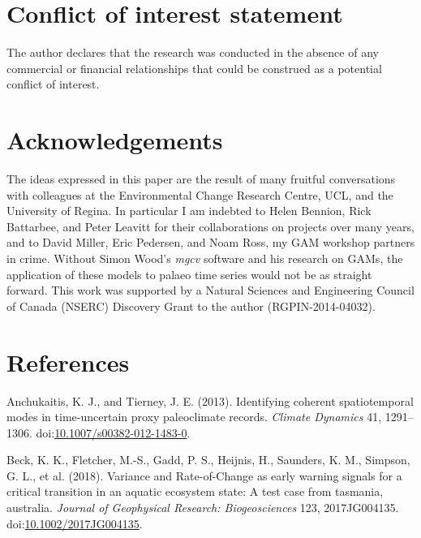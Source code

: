 \documentclass[12pt,]{article}
\begin{document}
\section*{Conflict of interest
statement}\label{conflict-of-interest-statement}

The author declares that the research was conducted in the absence of
any commercial or financial relationships that could be construed as a
potential conflict of interest.

\section*{Acknowledgements}\label{acknowledgements}

The ideas expressed in this paper are the result of many fruitful
conversations with colleagues at the Environmental Change Research
Centre, UCL, and the University of Regina. In particular I am indebted
to Helen Bennion, Rick Battarbee, and Peter Leavitt for their
collaborations on projects over many years, and to David Miller, Eric
Pedersen, and Noam Ross, my GAM workshop partners in crime. Without
Simon Wood's \emph{mgcv} software and his research on GAMs, the
application of these models to palaeo time series would not be as
straight forward. This work was supported by a Natural Sciences and
Engineering Council of Canada (NSERC) Discovery Grant to the author
(RGPIN-2014-04032).

\section*{References}\label{references}

\hypertarget{refs}{}
\hypertarget{ref-Anchukaitis2013-la}{}
Anchukaitis, K. J., and Tierney, J. E. (2013). Identifying coherent
spatiotemporal modes in time-uncertain proxy paleoclimate records.
\emph{Climate Dynamics} 41, 1291--1306.
doi:\href{https://doi.org/10.1007/s00382-012-1483-0}{10.1007/s00382-012-1483-0}.

\hypertarget{ref-Beck2018-zm}{}
Beck, K. K., Fletcher, M.-S., Gadd, P. S., Heijnis, H., Saunders, K. M.,
Simpson, G. L., et al. (2018). Variance and Rate-of-Change as early
warning signals for a critical transition in an aquatic ecosystem state:
A test case from tasmania, australia. \emph{Journal of Geophysical
Research: Biogeosciences} 123, 2017JG004135.
doi:\href{https://doi.org/10.1002/2017JG004135}{10.1002/2017JG004135}.
\end{document}
